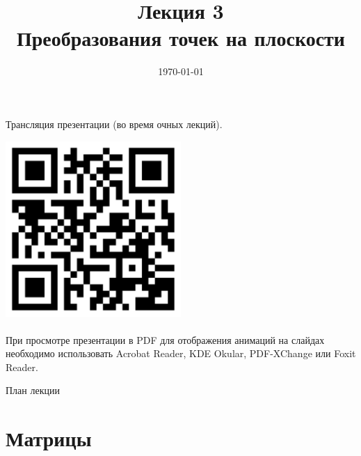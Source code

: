 \documentclass[10pt]{beamer}
\date{\today}
\title{Лекция 3 \\Преобразования точек на плоскости}
\begin{document}
 		 

    
    \begin{frame}[plain]
    	
    	
    	\centering
    	Трансляция презентации (во время очных лекций).     
    		
    	\includegraphics[width=0.5\textwidth]{qr.png} \\ ~ \\
    	
    	
    	При просмотре презентации в PDF для отображения анимаций на слайдах необходимо использовать Acrobat Reader, KDE Okular, PDF-XChange или Foxit Reader.

    \end{frame}
	
	
	\frame{\maketitle}
	
	
	
	\begin{frame}{План лекции}
		\tableofcontents
	\end{frame}
	
	\section{Матрицы}
	\frame{\sectionpage}
	
\end{document}

